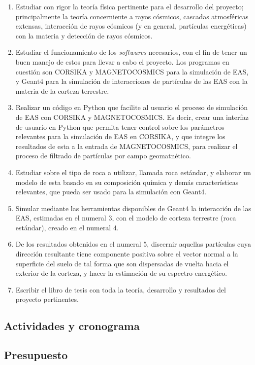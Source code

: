 \documentclass[12pt]{report}
\begin{document}
\begin{enumerate}
    \item Estudiar con rigor la teoría física pertinente para el desarrollo del proyecto; principalmente la teoría concerniente a rayos cósmicos, cascadas atmosféricas extensas, interacción de rayos cósmicos (y en general, partículas energéticas) con la materia y detección de rayos cósmicos.
    \item Estudiar el funcionamiento de los \textit{softwares} necesarios, con el fin de tener un buen manejo de estos para llevar a cabo el proyecto. Los programas en cuestión son CORSIKA y MAGNETOCOSMICS para la simulación de EAS, y Geant4 para la simulación de interacciones de partículas de las EAS con la materia de la corteza terrestre.
    \item Realizar un código en Python que facilite al usuario el proceso de simulación de EAS con CORSIKA y MAGNETOCOSMICS. Es decir, crear una interfaz de usuario en Python que permita tener control sobre los parámetros relevantes para la simulación de EAS en CORSIKA, y que integre los resultados de esta a la entrada de MAGNETOCOSMICS, para realizar el proceso de filtrado de partículas por campo geomatnético.
    \item Estudiar sobre el tipo de roca a utilizar, llamada roca estándar, y elaborar un modelo de esta basado en su composición química y demás características relevantes, que pueda ser usado para la simulación con Geant4.
    \item Simular mediante las herramientas disponibles de Geant4 la interacción de las EAS, estimadas en el numeral 3, con el modelo de corteza terrestre (roca estándar), creado en el numeral 4.
    \item De los resultados obtenidos en el numeral 5, discernir aquellas partículas cuya dirección resultante tiene componente positiva sobre el vector normal a la superficie del suelo de tal forma que son dispersadas de vuelta hacia el exterior de la corteza, y hacer la estimación de su espectro energético.
    \item Escribir el libro de tesis con toda la teoría, desarrollo y resultados del proyecto pertinentes.
\end{enumerate}

\subsection*{Actividades y cronograma}

\subsection*{Presupuesto}




\printbibliography
\end{document}
